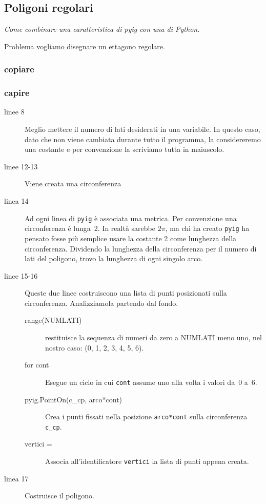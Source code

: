 \subsection{Poligoni regolari}
\label{subsec:geo_int_}

\emph{Come combinare una caratteristica di pyig con una di Python.}

Problema vogliamo disegnare un ettagono regolare.

\subsubsection{copiare}



\subsubsection{capire}

\begin{description}
 \item [linee 8] 
 Meglio mettere il numero di lati desiderati in una variabile. In questo caso, 
dato che non viene cambiata durante tutto il programma, la considereremo una 
costante e per convenzione la scriviamo tutta in maiuscolo.
 \item [linee 12-13] 
 Viene creata una circonferenza
 \item [linea 14] 
 Ad ogni linea di \lstinline{pyig} è associata una metrica. Per convenzione una 
circonferenza è lunga~2. In realtà sarebbe \(2\pi\), ma chi ha creato 
\lstinline{pyig} ha pensato fosse più semplice usare la costante 2 come 
lunghezza della circonferenza. Dividendo la lunghezza della circonferenza per 
il numero di lati del poligono, trovo la lunghezza di ogni singolo arco.
 \item [linee 15-16]
 Queste due linee costruiscono una lista di punti posizionati sulla 
circonferenza. Analizziamola partendo dal fondo.
\begin{description}
 \item [range(NUMLATI)] 
 restituisce la sequenza di numeri da zero a NUMLATI 
meno uno, nel nostro caso: (0, 1, 2, 3, 4, 5, 6).
 \item [for cont]
 Esegue un ciclo in cui \lstinline{cont} assume uno alla volta i valori da~0 
 a~6.
 \item [pyig.PointOn(c\_cp, arco*cont)]
 Crea i punti fissati nella posizione \lstinline{arco*cont} sulla circonferenza 
\lstinline{c_cp}.
 \item [vertici = ]
 Associa all'identificatore \lstinline{vertici} la lista di punti appena 
creata.
\end{description}
 \item [linea 17]
 Costruisce il poligono.
\end{description}

